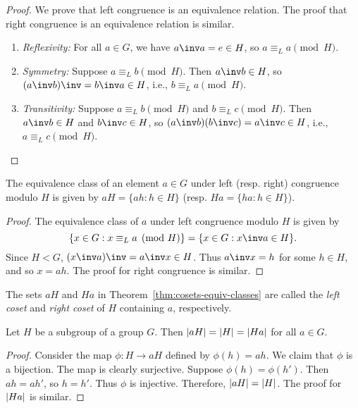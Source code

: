 \begin{proof}
    We prove that left congruence is an equivalence relation. The proof that
    right congruence is an equivalence relation is similar.

    \begin{enumerate}
        \item \emph{Reflexivity:} For all \(a \in G\), we have \(a\inv a = e \in
        H\), so \(a \equiv_L a \pmod{H}\).
        \item \emph{Symmetry:} Suppose \(a \equiv_L b \pmod{H}\). Then \(a\inv b
        \in H\), so \((a\inv b)\inv = b\inv a \in H\), i.e., \(b \equiv_L a
        \pmod{H}\).
        \item \emph{Transitivity:} Suppose \(a \equiv_L b \pmod{H}\) and \(b
        \equiv_L c \pmod{H}\). Then \(a\inv b \in H\) and \(b\inv c \in H\), so
        \((a\inv b)(b\inv c) = a\inv c \in H\), i.e., \(a \equiv_L c \pmod{H}\).
    \end{enumerate}
\end{proof}

\begin{theorem}
    \label{thm:cosets-equiv-classes}
    The equivalence class of an element \(a \in G\) under left (resp. right)
    congruence modulo \(H\) is given by \(aH = \{ah : h \in H\}\) (resp. \(Ha =
    \{ha : h \in H\}\)).
\end{theorem}

\begin{proof}
    The equivalence class of \(a\) under left congruence modulo \(H\) is given
    by
    \[
        \{ x \in G : x \equiv_L a \pmod{H} \} = \{ x \in G : x\inv a \in H \}.
    \]
    Since \(H < G\), \((x\inv a)\inv = a\inv x \in H\). Thus \(a\inv x = h\) for
    some \(h \in H\), and so \(x = ah\). The proof for right congruence is
    similar.
\end{proof}

\begin{definition}
    The sets \(aH\) and \(Ha\) in Theorem~\ref{thm:cosets-equiv-classes} are
    called the \emph{left coset} and \emph{right coset} of \(H\) containing
    \(a\), respectively.
\end{definition}

\begin{theorem}
    Let \(H\) be a subgroup of a group \(G\). Then \(\lvert aH \rvert = \lvert H \rvert =
    \lvert Ha \rvert\) for all \(a \in G\).
\end{theorem}

\begin{proof}
    Consider the map \(\phi: H \to aH\) defined by \(\phi(h) = ah\). We claim
    that \(\phi\) is a bijection. The map is clearly surjective. Suppose
    \(\phi(h) = \phi(h')\). Then \(ah = ah'\), so \(h = h'\). Thus \(\phi\) is
    injective. Therefore, \(\lvert aH \rvert = \lvert H \rvert\). The proof for
    \(\lvert Ha \rvert\) is similar.
\end{proof}

